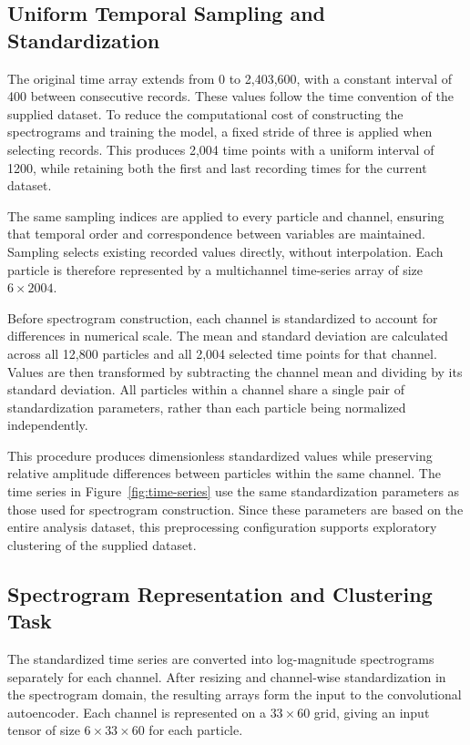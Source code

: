 \subsection{Uniform Temporal Sampling and Standardization}

The original time array extends from 0 to 2,403,600, with a constant interval of 400 between consecutive records. These values follow the time convention of the supplied dataset. To reduce the computational cost of constructing the spectrograms and training the model, a fixed stride of three is applied when selecting records. This produces 2,004 time points with a uniform interval of 1200, while retaining both the first and last recording times for the current dataset.

The same sampling indices are applied to every particle and channel, ensuring that temporal order and correspondence between variables are maintained. Sampling selects existing recorded values directly, without interpolation. Each particle is therefore represented by a multichannel time-series array of size \(6 \times 2004\).

Before spectrogram construction, each channel is standardized to account for differences in numerical scale. The mean and standard deviation are calculated across all 12,800 particles and all 2,004 selected time points for that channel. Values are then transformed by subtracting the channel mean and dividing by its standard deviation. All particles within a channel share a single pair of standardization parameters, rather than each particle being normalized independently.

This procedure produces dimensionless standardized values while preserving relative amplitude differences between particles within the same channel. The time series in Figure~\ref{fig:time-series} use the same standardization parameters as those used for spectrogram construction. Since these parameters are based on the entire analysis dataset, this preprocessing configuration supports exploratory clustering of the supplied dataset.

\subsection{Spectrogram Representation and Clustering Task}

The standardized time series are converted into log-magnitude spectrograms separately for each channel. After resizing and channel-wise standardization in the spectrogram domain, the resulting arrays form the input to the convolutional autoencoder. Each channel is represented on a \(33 \times 60\) grid, giving an input tensor of size \(6 \times 33 \times 60\) for each particle.

